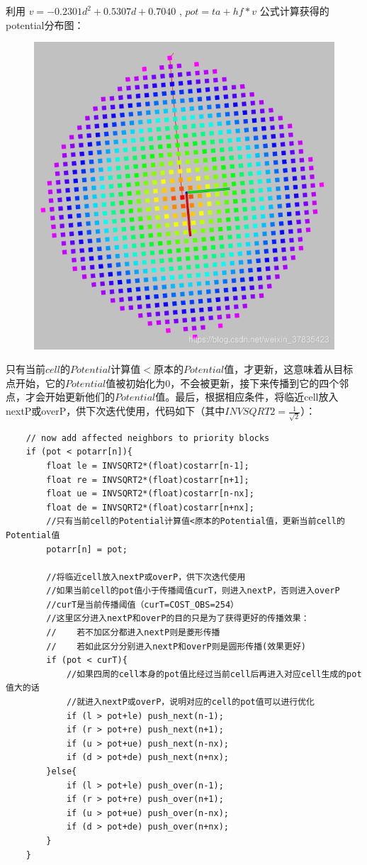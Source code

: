 \documentclass[9pt, oneside]{book}
\begin{document}
利用 $v = -0.2301d^2 + 0.5307d + 0.7040$ , $pot = ta + hf*v$ 公式计算获得的potential分布图：

\begin{figure}[H]
    \centering
    \includegraphics[width=0.5\linewidth]{image/pot_hard_equation.png}
\end{figure}

只有当前$cell$的$Potential$计算值$<$原本的$Potential$值，才更新，这意味着从目标点开始，它的$Potential$值被初始化为0，不会被更新，接下来传播到它的四个邻点，才会开始更新他们的$Potential$值。最后，根据相应条件，将临近cell放入nextP或overP，供下次迭代使用，代码如下（其中$INVSQRT2=\frac{1}{\sqrt{2}}$）：

\small
\begin{verbatim}
    // now add affected neighbors to priority blocks
    if (pot < potarr[n]){
        float le = INVSQRT2*(float)costarr[n-1];
        float re = INVSQRT2*(float)costarr[n+1];
        float ue = INVSQRT2*(float)costarr[n-nx];
        float de = INVSQRT2*(float)costarr[n+nx];
        //只有当前cell的Potential计算值<原本的Potential值，更新当前cell的Potential值
        potarr[n] = pot;

        //将临近cell放入nextP或overP，供下次迭代使用
        //如果当前cell的pot值小于传播阈值curT，则进入nextP，否则进入overP
        //curT是当前传播阈值（curT=COST_OBS=254）
        //这里区分进入nextP和overP的目的只是为了获得更好的传播效果：
        //    若不加区分都进入nextP则是菱形传播
        //    若如此区分分别进入nextP和overP则是圆形传播(效果更好)
        if (pot < curT){
            //如果四周的cell本身的pot值比经过当前cell后再进入对应cell生成的pot值大的话
            //就进入nextP或overP，说明对应的cell的pot值可以进行优化
            if (l > pot+le) push_next(n-1);
            if (r > pot+re) push_next(n+1);
            if (u > pot+ue) push_next(n-nx);
            if (d > pot+de) push_next(n+nx);
        }else{
            if (l > pot+le) push_over(n-1);
            if (r > pot+re) push_over(n+1);
            if (u > pot+ue) push_over(n-nx);
            if (d > pot+de) push_over(n+nx);
        }
    }
\end{verbatim}
\normalsize
\end{document}
